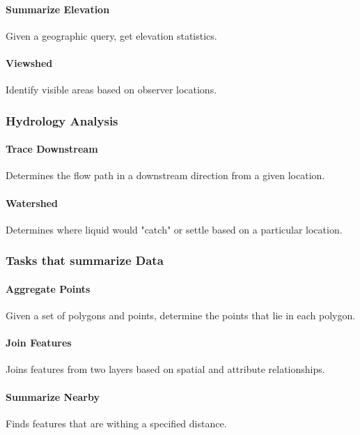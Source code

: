 \documentclass{vgtc}                          %
\begin{document}
\paragraph{Summarize Elevation}
Given a geographic query, get elevation statistics. 

\paragraph{Viewshed}
Identify visible areas based on observer locations.


\subsubsection{Hydrology Analysis}

\paragraph{Trace Downstream}
Determines the flow path in a downstream direction from a given location.

\paragraph{Watershed}
Determines where liquid would "catch" or settle based on a particular location.





\subsubsection{Tasks that summarize Data}

\paragraph{Aggregate Points}
Given a set of polygons and points, determine the points that lie in each polygon.


\paragraph{Join Features}
Joins features from two layers based on spatial and attribute relationships.

\paragraph{Summarize Nearby}
Finds features that are withing a specified distance.
\end{document}
